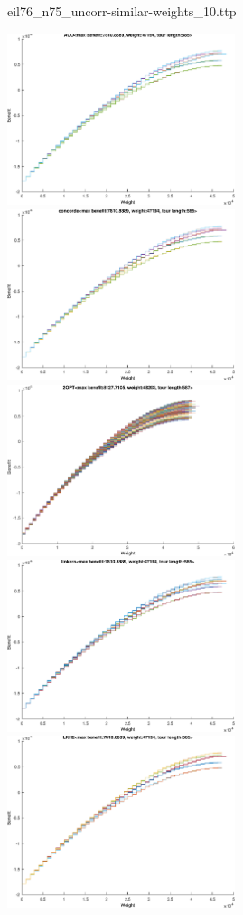 \documentclass{article}
\begin{document}
\newpage
eil76\_n75\_uncorr-similar-weights\_10.ttp

\noindent
\includegraphics[width=0.5\textwidth]{eil76figs/eil76_n75_uncorr-similar-weights_10.ttp.aco.txt.eps}
\includegraphics[width=0.5\textwidth]{eil76figs/eil76_n75_uncorr-similar-weights_10.ttp.con.txt.eps}
\includegraphics[width=0.5\textwidth]{eil76figs/eil76_n75_uncorr-similar-weights_10.ttp.inv.txt.eps}
\includegraphics[width=0.5\textwidth]{eil76figs/eil76_n75_uncorr-similar-weights_10.ttp.lkh.txt.eps}
\includegraphics[width=0.5\textwidth]{eil76figs/eil76_n75_uncorr-similar-weights_10.ttp.lkh2.txt.eps}
\end{document}

